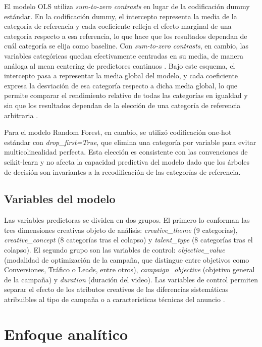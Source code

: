 \documentclass[12pt, a4paper]{report}
\begin{document}
El modelo OLS utiliza \textit{sum-to-zero contrasts} en lugar de la codificación
dummy estándar. En la codificación dummy, el intercepto representa la media de la
categoría de referencia y cada coeficiente refleja el efecto marginal de una categoría
respecto a esa referencia, lo que hace que los resultados dependan de cuál categoría
se elija como baseline. Con \textit{sum-to-zero contrasts}, en cambio, las variables
categóricas quedan efectivamente centradas en su media, de manera análoga al
mean centering de predictores continuos \citep{zhu2020}. Bajo este esquema, el intercepto
pasa a representar la media global del modelo, y cada coeficiente expresa la desviación
de esa categoría respecto a dicha media global, lo que permite comparar el rendimiento
relativo de todas las categorías en igualdad y sin que los resultados dependan
de la elección de una categoría de referencia arbitraria \citep[Cap.~8]{fox2016}.

Para el modelo Random Forest, en cambio, se utilizó codificación one-hot estándar con
\textit{drop\_first=True}, que elimina una categoría por variable para evitar multicolinealidad
perfecta. Esta elección es consistente con las convenciones de scikit-learn y no afecta la
capacidad predictiva del modelo dado que los árboles de decisión son invariantes a la
recodificación de las categorías de referencia.

\subsection*{Variables del modelo}

Las variables predictoras se dividen en dos grupos. El primero lo conforman las tres dimensiones
creativas objeto de análisis: \textit{creative\_theme} (9 categorías), \textit{creative\_concept}
(8 categorías tras el colapso) y \textit{talent\_type} (8 categorías tras el colapso). El segundo
grupo son las variables de control: \textit{objective\_value} (modalidad de optimización de la
campaña, que distingue entre objetivos como Conversiones, Tráfico o Leads, entre otros),
\textit{campaign\_objective} (objetivo general de la campaña) y \textit{duration} (duración del
video). Las variables de control permiten separar el efecto de los atributos creativos de las
diferencias sistemáticas atribuibles al tipo de campaña o a características técnicas del anuncio \citep[cap.~2]{cunningham2021}.

\section{Enfoque analítico}
\end{document}
